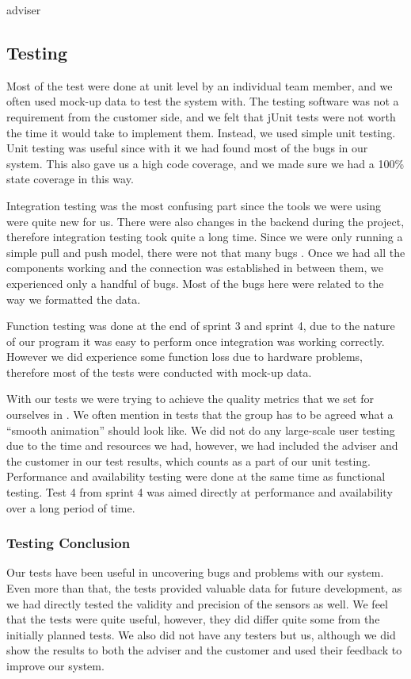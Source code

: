 adviser\documentclass[../document]{subfiles}
\begin{document}
\subsection{Testing}
Most of the test were done at unit level by an individual team member, and we often used mock-up data to test the system with. The testing software was not a requirement from the customer side, and we felt that jUnit tests were not worth the time it would take to implement them. Instead, we used simple unit testing. Unit testing was useful since with it we had found most of the bugs in our system. This also gave us a high code coverage, and we made sure we had a 100\% state coverage in this way.

Integration testing was the most confusing part since the tools we were using were quite new for us. There were also changes in the backend during the project, therefore integration testing took quite a long time. Since we were only running a simple pull and push model, there were not that many bugs . Once we had all the components working and the connection was established in between them, we experienced only a handful of bugs. Most of the bugs here were related to the way we formatted the data.

Function testing was done at the end of sprint 3 and sprint 4, due to the nature of our program it was easy to perform once integration was working correctly. However we did experience some function loss due to hardware problems, therefore most of the tests were conducted with mock-up data.

With our tests we were trying to achieve the quality metrics that we set for ourselves in . We often mention in tests that the group has to be agreed what a “smooth animation” should look like. We did not do any large-scale user testing due to the time and resources we had, however, we had included the adviser and the customer in our test results, which counts as a part of our unit testing. Performance and availability testing were done at the same time as functional testing. Test 4 from sprint 4 was aimed directly at performance and availability over a long period of time. 

\subsubsection{Testing Conclusion}
Our tests have been useful in uncovering bugs and problems with our system. Even more than that, the tests provided valuable data for future development, as we had directly tested the validity and precision of the sensors as well. We feel that the tests were quite useful, however, they did differ quite some from the initially planned tests. We also did not have any testers but us, although we did show the results to both the adviser and the customer and used their feedback to improve our system. 
\end{document}
